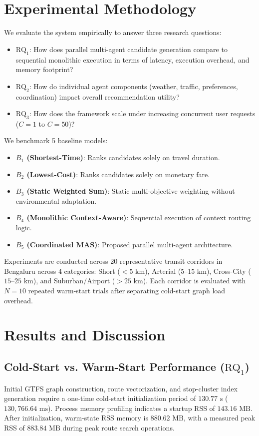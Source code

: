 \documentclass[runningheads]{llncs}
\begin{document}
\section{Experimental Methodology}
\label{sec:exp_setup}

We evaluate the system empirically to answer three research questions:
\begin{itemize}
    \item \textbf{$\text{RQ}_1$}: How does parallel multi-agent candidate generation compare to sequential monolithic execution in terms of latency, execution overhead, and memory footprint?
    \item \textbf{$\text{RQ}_2$}: How do individual agent components (weather, traffic, preferences, coordination) impact overall recommendation utility?
    \item \textbf{$\text{RQ}_3$}: How does the framework scale under increasing concurrent user requests ($C=1$ to $C=50$)?
\end{itemize}

We benchmark 5 baseline models:
\begin{itemize}
    \item \textbf{$B_1$ (Shortest-Time)}: Ranks candidates solely on travel duration.
    \item \textbf{$B_2$ (Lowest-Cost)}: Ranks candidates solely on monetary fare.
    \item \textbf{$B_3$ (Static Weighted Sum)}: Static multi-objective weighting without environmental adaptation.
    \item \textbf{$B_4$ (Monolithic Context-Aware)}: Sequential execution of context routing logic.
    \item \textbf{$B_5$ (Coordinated MAS)}: Proposed parallel multi-agent architecture.
\end{itemize}

Experiments are conducted across 20 representative transit corridors in Bengaluru across 4 categories: Short ($<5\text{ km}$), Arterial ($5\text{--}15\text{ km}$), Cross-City ($15\text{--}25\text{ km}$), and Suburban/Airport ($>25\text{ km}$). Each corridor is evaluated with $N=10$ repeated warm-start trials after separating cold-start graph load overhead.


\section{Results and Discussion}
\label{sec:results}

\subsection{Cold-Start vs. Warm-Start Performance ($\text{RQ}_1$)}
Initial GTFS graph construction, route vectorization, and stop-cluster index generation require a one-time cold-start initialization period of $130.77\text{ s}$ ($130,766.64\text{ ms}$). Process memory profiling indicates a startup RSS of $143.16\text{ MB}$. After initialization, warm-state RSS memory is $880.62\text{ MB}$, with a measured peak RSS of $883.84\text{ MB}$ during peak route search operations.
\end{document}
